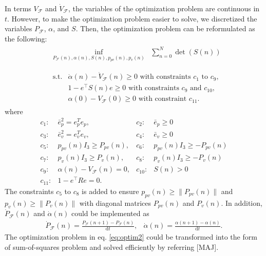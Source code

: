 \documentclass[letterpaper, 10 pt, conference]{ieeeconf}  %
\begin{document}
In terms $V_\mathcal{F}$ and $\dot{V}_\mathcal{F}$, the variables of the optimization problem are continuous in $t$. 
However, to make the optimization problem easier to solve, 
we discretized the variables $P_\mathcal{F}$, $\alpha$, and $S$. 
Then, the optimization problem can be reformulated as the following:
\begin{align}
&
\begin{array}{rl}
\displaystyle{\inf_{P_\mathcal{F}(n),\alpha(n),S(n),p_{pv}(n),p_v(n)}} & \displaystyle{\sum_{n=0}^{N}} \det(S(n))  \\
\end{array} \label{eq:optim2} \\
&
\begin{array}{rl}
\displaystyle{\text{s.t.}}& \dot{\alpha}(n) - \dot{V}_\mathcal{F}(n) \geq 0\text{ with constraints $c_1$ to $c_9$},  \\
& 1-e^\top S(n) e \geq 0\text{ with constraints $c_9$ and $c_{10}$}, \nonumber \\
& \alpha(0) - V_\mathcal{F}(0) \geq 0\text{ with constraint $c_{11}$}. \nonumber
\end{array} \nonumber 
\end{align}
where
\begin{equation}
\begin{array}{rlrl}
c_1:& \bar{e}_p^2 = e_p^Te_p,           & c_2:&\bar{e}_p \geq 0 \\
c_3:& \bar{e}_v^2 = e_v^Te_v,           & c_4:&\bar{e}_v \geq 0 \\
c_5:& p_{pv}(n)I_3 \geq P_{pv}(n),      & c_6:&p_{pv}(n)I_3 \geq -P_{pv}(n) \\
c_7:& p_{ v}(n)I_3 \geq P_{ v}(n),      & c_8:&p_{ v}(n)I_3 \geq -P_{ v}(n) \\
c_9:& \alpha(n) - V_\mathcal{F}(n) = 0, & c_{10}:&S(n) > 0 \\
c_{11}:& 1-e^\top R e = 0. &&
\end{array} \nonumber
\end{equation}
The constraints $c_5$ to $c_8$ is added to ensure
 $p_{pv}(n) \geq \|P_{pv}(n)\|$ and $p_v(n) \geq \|P_v(n)\|$ 
with diagonal matrices $P_{pv}(n)$ and $P_v(n)$.
In addition, $\dot{P}_\mathcal{F}(n)$ and $\dot{\alpha}(n)$ could be implemented as
\begin{equation}
\begin{array}{cc}
\dot{P}_\mathcal{F}(n) = \frac{P_\mathcal{F}(n+1) - P_\mathcal{F}(n)}{\text{d}t}, & \dot{\alpha}(n) = \frac{\alpha(n+1)-\alpha(n)}{\text{d}t}. 
\end{array} \nonumber
\end{equation}
The optimization problem in eq. \eqref{eq:optim2} could be transformed into the form of sum-of-squares problem and solved efficiently by referring [MAJ].
\end{document}
